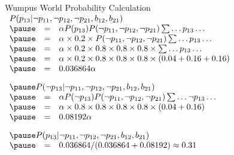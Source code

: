 \documentclass[14pt]{beamer}
\begin{document}
\begin{frame}{Wumpus World Probability Calculation}
	$
	\begin{array}{lll}
	\lefteqn{P(p_{13}|\lnot p_{11}, \lnot p_{12}, \lnot p_{21}, b_{12}, b_{21})}
	\\
	\pause
	& = &
	\alpha
	P(p_{13})
	P(\lnot p_{11},\lnot p_{12},\lnot p_{21})
	\sum\ldots p_{13}\ldots
	\\
	\pause
	& = &
	\alpha \times
  0.2 \times
	P(\lnot p_{11},\lnot p_{12},\lnot p_{21})
	\sum\ldots p_{13}\ldots
  \\
  \pause
  & = &
  \alpha \times
  0.2 \times
  0.8 \times 0.8 \times 0.8 \times
  \sum\ldots p_{13}\ldots
  \\
  \pause
  & = &
  \alpha \times
  0.2 \times
  0.8 \times 0.8 \times 0.8 \times
  (0.04 + 0.16 + 0.16)
  \\
  \pause
  & = & 0.036864\alpha
  \\[1em]
  \pause
	\lefteqn{P(\lnot p_{13}|\lnot p_{11}, \lnot p_{12}, \lnot p_{21}, b_{12}, b_{21})}
	\\
	\pause
	& = & 
	\alpha
	P(\lnot p_{13})
	P(\lnot p_{11},\lnot p_{12},\lnot p_{21})
	\sum\ldots \lnot p_{13}\ldots
  \\
  \pause
  & = &
  \alpha \times
  0.8 \times
  0.8 \times 0.8 \times 0.8 \times
  (0.04 + 0.16)
  \\
  \pause
  & = & 0.08192\alpha
  \\[1em]
  \pause
  \lefteqn{P(p_{13}|\lnot p_{11}, \lnot p_{12}, \lnot p_{21}, b_{12}, b_{21})}
  \\
  \pause
  & = & 0.036864 / (0.036864 + 0.08192) \approx 0.31
  \end{array}
  $
\end{frame}
\end{document}
